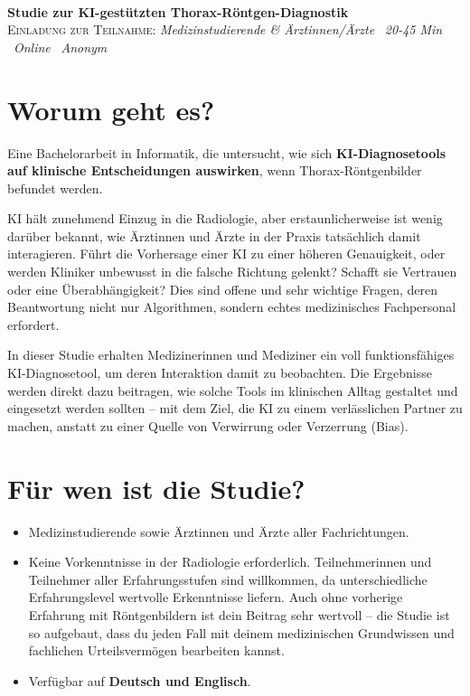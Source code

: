 \documentclass[10pt,a4paper]{article}
\begin{document}
\thispagestyle{empty}

\noindent{\color{accent}\rule{\linewidth}{2.5pt}}\\[0.45em]
{\LARGE\bfseries\color{accent}Studie zur KI-gestützten Thorax-Röntgen-Diagnostik}\\[0.35em]
{\footnotesize\color{textmuted}\textsc{Einladung zur Teilnahme}: 
\textit{Medizinstudierende \& Ärztinnen/Ärzte} \textbullet\ 
\textit{20-45 Min} \textbullet\ 
\textit{Online} \textbullet\ 
\textit{Anonym}}

\vspace{0.85em}

\section{Worum geht es?}

Eine Bachelorarbeit in Informatik, die untersucht, wie sich \textbf{KI-Diagnosetools auf klinische Entscheidungen auswirken}, wenn Thorax-Röntgenbilder befundet werden.

KI hält zunehmend Einzug in die Radiologie, aber erstaunlicherweise ist wenig darüber bekannt, wie Ärztinnen und Ärzte in der Praxis tatsächlich damit interagieren. Führt die Vorhersage einer KI zu einer höheren Genauigkeit, oder werden Kliniker unbewusst in die falsche Richtung gelenkt? Schafft sie Vertrauen oder eine Überabhängigkeit? Dies sind offene und sehr wichtige Fragen, deren Beantwortung nicht nur Algorithmen, sondern echtes medizinisches Fachpersonal erfordert.

In dieser Studie erhalten Medizinerinnen und Mediziner ein voll funktionsfähiges KI-Diagnosetool, um deren Interaktion damit zu beobachten. Die Ergebnisse werden direkt dazu beitragen, wie solche Tools im klinischen Alltag gestaltet und eingesetzt werden sollten – mit dem Ziel, die KI zu einem verlässlichen Partner zu machen, anstatt zu einer Quelle von Verwirrung oder Verzerrung (Bias).

\section{Für wen ist die Studie?}

\begin{itemize}
  \item Medizinstudierende sowie Ärztinnen und Ärzte aller Fachrichtungen.
  \item Keine Vorkenntnisse in der Radiologie erforderlich. Teilnehmerinnen und Teilnehmer aller Erfahrungsstufen sind willkommen, da unterschiedliche Erfahrungslevel wertvolle Erkenntnisse liefern. Auch ohne vorherige Erfahrung mit Röntgenbildern ist dein Beitrag sehr wertvoll – die Studie ist so aufgebaut, dass du jeden Fall mit deinem medizinischen Grundwissen und fachlichen Urteilsvermögen bearbeiten kannst.
  \item Verfügbar auf \textbf{Deutsch und Englisch}.
\end{itemize}
\end{document}
